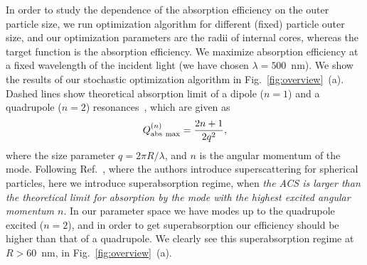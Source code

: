 \documentclass[aps,prl,twocolumn,showpacs,superscriptaddress,groupedaddress]{revtex4-1}
\begin{document}
\begin{figure}
\end{figure}
%
In order to study the dependence of the absorption efficiency on the
outer particle size, we run optimization algorithm for different
(fixed) particle outer size, and our optimization parameters are the
radii of internal cores, whereas the target function is the absorption
efficiency. We maximize absorption efficiency at a fixed wavelength of
the incident light (we have chosen $\lambda=500$~nm). We show the
results of our stochastic optimization algorithm in
Fig.~\ref{fig:overview}~(a).  Dashed lines show theoretical absorption
limit of a dipole ($n=1$) and a quadrupole ($n=2$)
resonances~\cite{Tribelsky-2011}, which are given as $$Q^{(n)}_{\rm
  abs\ max}=\frac{2n+1}{2q^2},$$ where the size parameter $q=2\pi
R/\lambda$, and $n$ is the angular momentum of the mode. Following
Ref.~\cite{Fan-2011}, where the authors introduce superscattering for
spherical particles, here we introduce superabsorption regime, when
{\em the ACS is larger than the theoretical limit for absorption by
  the mode with the highest excited angular momentum $n$}. In our
parameter space we have modes up to the quadrupole excited
($n=2$), and in order to get superabsorption our efficiency should be
higher than that of a quadrupole. We clearly see this superabsorption
regime at $R>60$~nm, in Fig.~\ref{fig:overview}~(a).
\end{document}
